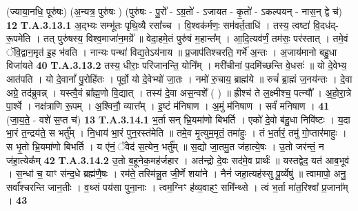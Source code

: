 \documentclass[17pt]{extarticle}
\begin{document}
                (ज्याया॒नधि॒ पूरु॑षः) (अ॒न्यत्र॒ पुरु॑षः ) \newline
                                      (पुरु॑षः - पु॒रो᳚ - ऽग्र॒तो॑ - ऽजायत - कृ॒तो॑ - ऽकल्पयन् - नास॒न् द्वे च॑) \textbf{12} \newline \newline
                                \textbf{ T.A.3.13.1} \newline
                  अ॒द्भ्यः सम्भू॑तः पृथि॒व्यै रसा᳚च्च । वि॒श्वक॑र्मणः॒ सम॑वर्त॒ताधि॑ ।  तस्य॒ त्वष्टा॑ वि॒दध॑द्-रू॒पमे॑ति । तत् पुरु॑षस्य॒ विश्व॒माजा॑न॒मग्रे᳚ ॥ वेदा॒हमे॒तं पुरु॑षं म॒हान्त᳚म् । आ॒दि॒त्यव॑र्णं॒ तम॑सः॒ पर॑स्तात् ।  तमे॒वं ॅवि॒द्वान॒मृत॑ इ॒ह भ॑वति । नान्यः पन्था॑ विद्य॒तेऽय॑नाय ॥ प्र॒जाप॑तिश्चरति॒ गर्भे॑ अ॒न्तः । अ॒जाय॑मानो बहु॒धा विजा॑यते \textbf{ 40} \newline
                  \newline
                                                                  \textbf{ T.A.3.13.2} \newline
                  तस्य॒ धीराः॒ परि॑जानन्ति॒ योनि᳚म् । मरी॑चीनां प॒दमि॑च्छन्ति वे॒धसः॑ ॥ यो दे॒वेभ्य॒ आत॑पति । यो दे॒वानां᳚ पु॒रोहि॑तः । पूर्वो॒ यो दे॒वेभ्यो॑ जा॒तः । नमो॑ रु॒चाय॒ ब्राह्म॑ये ॥ रुचं॑ ब्रा॒ह्मं ज॒नय॑न्तः । दे॒वा अग्रे॒ तद॑ब्रुवन्न् ।  यस्त्वै॒वं ब्रा᳚ह्म॒णो वि॒द्यात् । तस्य॑ दे॒वा अस॒न्वशे᳚ ( ) ॥ ह्रीश्च॑ ते ल॒क्ष्मीश्च॒ पत्न्यौ᳚ । अ॒हो॒रा॒त्रे पा॒र्श्वे । नक्ष॑त्राणि रू॒पम् । अ॒श्विनौ॒ व्यात्त᳚म् । इ॒ष्टं म॑निषाण । अ॒मुं म॑निषाण । सर्वं॑ मनिषाण । \textbf{ 41} \newline
                  \newline
                                                        (जा॒य॒ते॒ - वशे॑ स॒प्त च॑) \textbf{13} \newline \newline
                                \textbf{ T.A.3.14.1} \newline
                  भ॒र्ता सन् भ्रि॒यमा॑णो बिभर्ति । एको॑ दे॒वो ब॑हु॒धा निवि॑ष्टः । य॒दा भा॒रं त॒न्द्रय॑ते॒ स भर्तु᳚म् । नि॒धाय॑ भा॒रं पुन॒रस्त॑मेति ॥  तमे॒व मृ॒त्युम॒मृतं॒ तमा॑हुः । तं भ॒र्तारं॒ तमु॑ गो॒प्तार॑माहुः । स भृ॒तो भ्रि॒यमा॑णो बिभर्ति । य ए॑नं॒ ॅवेद॑ स॒त्येन॒ भर्तु᳚म् ॥ स॒द्यो जा॒तमु॒त ज॑हात्ये॒षः । उ॒तो जर॑न्तं॒ न ज॑हा॒त्येक᳚म् \textbf{ 42} \newline
                  \newline
                                                                  \textbf{ T.A.3.14.2} \newline
                  उ॒तो ब॒हूनेक॒मह॑र्जहार । अत॑न्द्रो दे॒वः सद॑मे॒व प्रार्थः॑ ॥ यस्तद्वेद॒ यत॑ आब॒भूव॑ । स॒न्धां च॒ याꣳ स॑न्द॒धे ब्रह्म॑णै॒षः ।  रम॑ते॒ तस्मि॑न्नु॒त जी॒र्णे शया॑ने । नैनं॑ जहा॒त्यह॑स्सु पू॒र्व्येषु॑ ॥ त्वामापो॒ अनु॒ सर्वा᳚श्चरन्ति जान॒तीः । व॒थ्सं पय॑सा पुना॒नाः ।  त्वम॒ग्निꣳ ह॑व्य॒वाहꣳ॒॒ समि᳚न्थ्से ।  त्वं भ॒र्ता मा॑त॒रिश्वा᳚ प्र॒जाना᳚म् । \textbf{ 43} \newline
\end{document}
